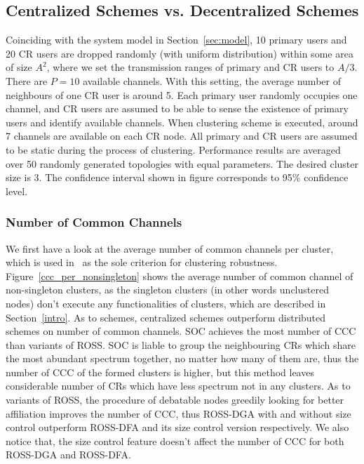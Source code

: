 \subsection{Centralized Schemes vs. Decentralized Schemes}
Coinciding with the system model in Section~\ref{sec:model}, 10 primary users and 20 CR users are dropped randomly (with uniform distribution) within some area of size $A^{2}$, where we set the transmission ranges of primary and CR users to $A/3$. There are $P=10$ available channels. 
With this setting, the average number of neighbours of one CR user is around 5.
Each primary user randomly occupies one channel, and CR users are assumed to be able to sense the existence of primary users and identify available channels.
When clustering scheme is executed, around 7 channels are available on each CR node.
All primary and CR users are assumed to be static during the process of clustering.
Performance results are averaged over 50 randomly generated topologies with equal parameters.
The desired cluster size is 3.
The confidence interval shown in figure corresponds to 95\% confidence level.

\subsubsection{Number of Common Channels}
\label{ccc_20}
We first have a look at the average number of common channels per cluster, which is used in~\cite{LIU_TMC11_2} as the sole criterion for clustering robustness.
Figure~\ref{ccc_per_nonsingleton} shows the average number of common channel of non-singleton clusters, as the singleton clusters (in other words unclustered nodes) don't execute any functionalities of clusters, which are described in Section~\ref{intro}.
As to schemes, centralized schemes outperform distributed schemes on number of common channels.
SOC achieves the most number of CCC than variants of ROSS.
SOC is liable to group the neighbouring CRs which share the most abundant spectrum together, no matter how many of them are, thus the number of CCC of the formed clusters is higher, but this method leaves considerable number of CRs which have less spectrum not in any clusters.
As to variants of ROSS, the procedure of debatable nodes greedily looking for better affiliation improves the number of CCC, thus ROSS-DGA with and without size control outperform ROSS-DFA and its size control version respectively.
We also notice that, the size control feature doesn't affect the number of CCC for both ROSS-DGA and ROSS-DFA.


